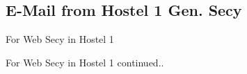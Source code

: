 \documentclass{article}
\begin{document}
	\subsection{E-Mail from Hostel 1 Gen. Secy}
		For Web Secy in Hostel 1
		\begin{figure}[h]
		\end{figure}
\newpage
		\noindent For Web Secy in Hostel 1 continued..
		\begin{figure}[h]
		\end{figure}
\end{document}
